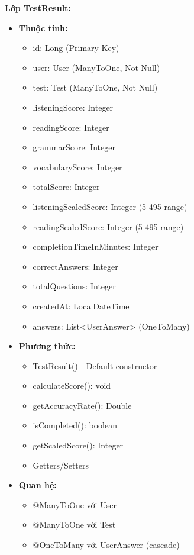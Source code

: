 \documentclass[../DoAn.tex]{subfiles}
\begin{document}
\textbf{Lớp TestResult:}
\begin{itemize}
    \item \textbf{Thuộc tính:}
    \begin{itemize}
        \item id: Long (Primary Key)
        \item user: User (ManyToOne, Not Null)
        \item test: Test (ManyToOne, Not Null)
        \item listeningScore: Integer
        \item readingScore: Integer
        \item grammarScore: Integer
        \item vocabularyScore: Integer
        \item totalScore: Integer
        \item listeningScaledScore: Integer (5-495 range)
        \item readingScaledScore: Integer (5-495 range)
        \item completionTimeInMinutes: Integer
        \item correctAnswers: Integer
        \item totalQuestions: Integer
        \item createdAt: LocalDateTime
        \item answers: List<UserAnswer> (OneToMany)
    \end{itemize}
    \item \textbf{Phương thức:}
    \begin{itemize}
        \item TestResult() - Default constructor
        \item calculateScore(): void
        \item getAccuracyRate(): Double
        \item isCompleted(): boolean
        \item getScaledScore(): Integer
        \item Getters/Setters
    \end{itemize}
    \item \textbf{Quan hệ:}
    \begin{itemize}
        \item @ManyToOne với User
        \item @ManyToOne với Test  
        \item @OneToMany với UserAnswer (cascade)
    \end{itemize}
\end{itemize}
\end{document}
